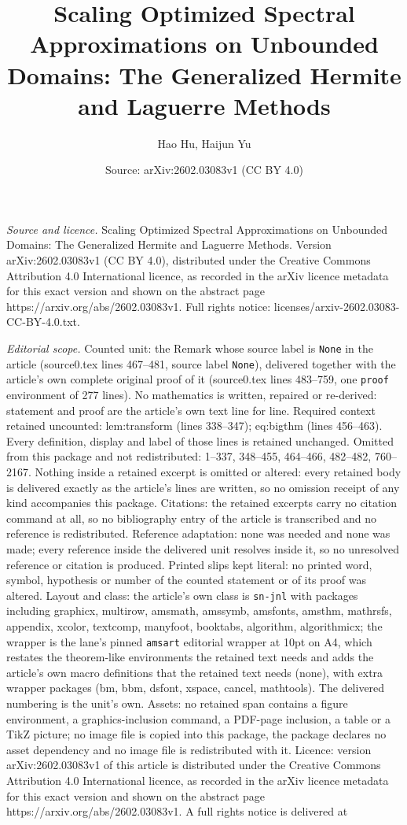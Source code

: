 \documentclass[10pt,a4paper]{amsart}
\title[Scaling Optimized Spectral Approximations on Unbounded Domai]{Scaling Optimized Spectral Approximations on Unbounded Domains: The Generalized Hermite and Laguerre Methods}
\author{Hao Hu, Haijun Yu}
\date{Source: arXiv:2602.03083v1 (CC BY 4.0)}
\begin{document}
\maketitle

\noindent\emph{Source and licence.} Scaling Optimized Spectral Approximations on Unbounded Domains: The Generalized Hermite and Laguerre Methods. Version arXiv:2602.03083v1 (CC BY 4.0), distributed under the Creative Commons Attribution 4.0 International licence, as recorded in the arXiv licence metadata for this exact version and shown on the abstract page https://arxiv.org/abs/2602.03083v1. Full rights notice: licenses/arxiv-2602.03083-CC-BY-4.0.txt.\par\smallskip

\noindent\textit{Editorial scope.} Counted unit: the Remark whose source label is \texttt{None} in the article (source0.tex lines 467--481, source label \texttt{None}), delivered together with the article's own complete original proof of it (source0.tex lines 483--759, one \texttt{proof} environment of 277 lines). No mathematics is written, repaired or re-derived: statement and proof are the article's own text line for line. Required context retained uncounted: lem:transform (lines 338--347); eq:bigthm (lines 456--463). Every definition, display and label of those lines is retained unchanged. Omitted from this package and not redistributed: 1--337, 348--455, 464--466, 482--482, 760--2167. Nothing inside a retained excerpt is omitted or altered: every retained body is delivered exactly as the article's lines are written, so no omission receipt of any kind accompanies this package. Citations: the retained excerpts carry no citation command at all, so no bibliography entry of the article is transcribed and no reference is redistributed. Reference adaptation: none was needed and none was made; every reference inside the delivered unit resolves inside it, so no unresolved reference or citation is produced. Printed slips kept literal: no printed word, symbol, hypothesis or number of the counted statement or of its proof was altered. Layout and class: the article's own class is \texttt{sn-jnl} with packages including graphicx, multirow, amsmath, amssymb, amsfonts, amsthm, mathrsfs, appendix, xcolor, textcomp, manyfoot, booktabs, algorithm, algorithmicx; the wrapper is the lane's pinned \texttt{amsart} editorial wrapper at 10pt on A4, which restates the theorem-like environments the retained text needs and adds the article's own macro definitions that the retained text needs (none), with extra wrapper packages (bm, bbm, dsfont, xspace, cancel, mathtools). The delivered numbering is the unit's own. Assets: no retained span contains a figure environment, a graphics-inclusion command, a PDF-page inclusion, a table or a TikZ picture; no image file is copied into this package, the package declares no asset dependency and no image file is redistributed with it. Licence: version arXiv:2602.03083v1 of this article is distributed under the Creative Commons Attribution 4.0 International licence, as recorded in the arXiv licence metadata for this exact version and shown on the abstract page https://arxiv.org/abs/2602.03083v1. A full rights notice is delivered at 
\end{document}
